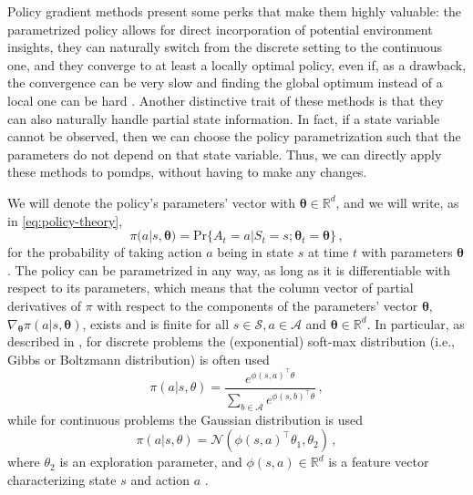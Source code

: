 Policy gradient methods present some perks that make them highly valuable: the parametrized policy allows for direct incorporation of potential environment insights, they can naturally switch from the discrete setting to the continuous one, and they converge to at least a locally optimal policy, even if, as a drawback, the convergence can be very slow and finding the global optimum instead of a local one can be hard \cite{Peters2010}. Another distinctive trait of these methods is that they can also naturally handle partial state information. In fact, if a state variable cannot be observed, then we can choose the policy parametrization such that the parameters do not depend on that state variable. Thus, we can directly apply these methods to \acrshort{pomdp}s, without having to make any changes.

We will denote the policy's parameters' vector with $\boldsymbol \theta \in \mathbb R^{d}$, and we will write, as in \eqref{eq:policy-theory},
\begin{equation}
    \pi(a|s,\boldsymbol \theta) = \text{Pr}\{A_t = a | S_t = s; \boldsymbol \theta_t = \boldsymbol {\theta}\} \, ,
    \label{eq:policy-with-parameters}
\end{equation}
for the probability of taking action $a$ being in state $s$ at time $t$ with parameters $\boldsymbol \theta$ \cite{SuttonBarto}. The policy can be parametrized in any way, as long as it is differentiable with respect to its parameters, which means that the column vector of partial derivatives of $\pi$ with respect to the components of the parameters' vector $\boldsymbol \theta$, $\nabla_{\boldsymbol \theta} \pi (a|s,\boldsymbol \theta)$, exists and is finite for all $s \in \mathcal S, a \in \mathcal A$ and $\boldsymbol \theta \in \mathbb R^{d}$. In particular, as described in \cite{Peters2010}, for discrete problems the (exponential) soft-max distribution (i.e., Gibbs or Boltzmann distribution) is often used
\begin{equation}
    \pi(a|s, \theta) = \frac{e^{\phi(s,a)^\top \theta}}{\sum_{b \in \mathcal A} e^{\phi(s,b)^\top \theta}} \, ,
    \label{eq:pi-boltzmann}
\end{equation}
while for continuous problems the Gaussian distribution is used
\begin{equation}
    \pi(a|s, \theta) = \mathcal N(\phi(s,a)^\top \theta_1, \theta_2) \, ,
\end{equation}
where $\theta_2$ is an exploration parameter, and $\phi(s,a) \in \mathbb R^{d}$ is a feature vector characterizing state $s$ and action $a$ \cite{Sutton2000}.

